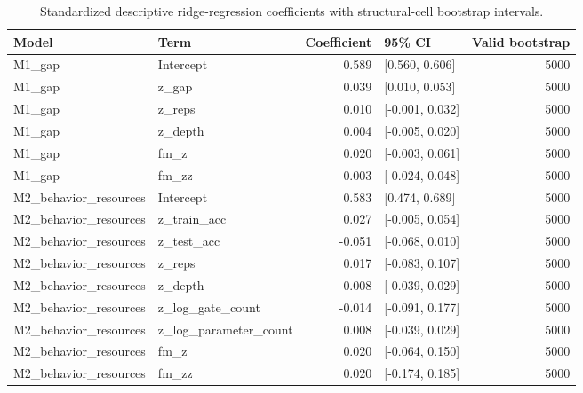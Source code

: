 \begin{table}[t]
\caption{Standardized descriptive ridge-regression coefficients with structural-cell bootstrap intervals.}
\label{tab:gap-auc-coefficients}
\begin{tabular}{llrlr}
\toprule
Model & Term & Coefficient & 95\% CI & Valid bootstrap \\
\midrule
M1\_gap & Intercept & 0.589 & [0.560, 0.606] & 5000 \\
M1\_gap & z\_gap & 0.039 & [0.010, 0.053] & 5000 \\
M1\_gap & z\_reps & 0.010 & [-0.001, 0.032] & 5000 \\
M1\_gap & z\_depth & 0.004 & [-0.005, 0.020] & 5000 \\
M1\_gap & fm\_z & 0.020 & [-0.003, 0.061] & 5000 \\
M1\_gap & fm\_zz & 0.003 & [-0.024, 0.048] & 5000 \\
M2\_behavior\_resources & Intercept & 0.583 & [0.474, 0.689] & 5000 \\
M2\_behavior\_resources & z\_train\_acc & 0.027 & [-0.005, 0.054] & 5000 \\
M2\_behavior\_resources & z\_test\_acc & -0.051 & [-0.068, 0.010] & 5000 \\
M2\_behavior\_resources & z\_reps & 0.017 & [-0.083, 0.107] & 5000 \\
M2\_behavior\_resources & z\_depth & 0.008 & [-0.039, 0.029] & 5000 \\
M2\_behavior\_resources & z\_log\_gate\_count & -0.014 & [-0.091, 0.177] & 5000 \\
M2\_behavior\_resources & z\_log\_parameter\_count & 0.008 & [-0.039, 0.029] & 5000 \\
M2\_behavior\_resources & fm\_z & 0.020 & [-0.064, 0.150] & 5000 \\
M2\_behavior\_resources & fm\_zz & 0.020 & [-0.174, 0.185] & 5000 \\
\bottomrule
\end{tabular}
\end{table}
